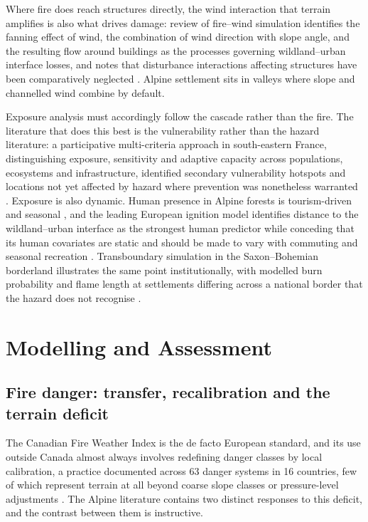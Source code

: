 \documentclass[11pt,a4paper]{article}
\begin{document}
Where fire does reach structures directly, the wind interaction that terrain amplifies is also what drives damage: review of fire--wind simulation identifies the fanning effect of wind, the combination of wind direction with slope angle, and the resulting flow around buildings as the processes governing wildland--urban interface losses, and notes that disturbance interactions affecting structures have been comparatively neglected \citep{ghodrat_existing_2021}. Alpine settlement sits in valleys where slope and channelled wind combine by default.

Exposure analysis must accordingly follow the cascade rather than the fire. The literature that does this best is the vulnerability rather than the hazard literature: a participative multi-criteria approach in south-eastern France, distinguishing exposure, sensitivity and adaptive capacity across populations, ecosystems and infrastructure, identified secondary vulnerability hotspots and locations not yet affected by hazard where prevention was nonetheless warranted \citep{riviere_mapping_2023}. Exposure is also dynamic. Human presence in Alpine forests is tourism-driven and seasonal \citep{pede_mountain_2022, abrham_wildfires_2024}, and the leading European ignition model identifies distance to the wildland--urban interface as the strongest human predictor while conceding that its human covariates are static and should be made to vary with commuting and seasonal recreation \citep{gelabert_assessing_2025}. Transboundary simulation in the Saxon--Bohemian borderland illustrates the same point institutionally, with modelled burn probability and flame length at settlements differing across a national border that the hazard does not recognise \citep{avouris_exposure_2025}.


\section{Modelling and Assessment}
\label{sec:modelling}

\subsection{Fire danger: transfer, recalibration and the terrain deficit}

The Canadian Fire Weather Index is the de facto European standard, and its use outside Canada almost always involves redefining danger classes by local calibration, a practice documented across 63 danger systems in 16 countries, few of which represent terrain at all beyond coarse slope classes or pressure-level adjustments \citep{zacharakis_environmental_2023}. The Alpine literature contains two distinct responses to this deficit, and the contrast between them is instructive.
\end{document}
